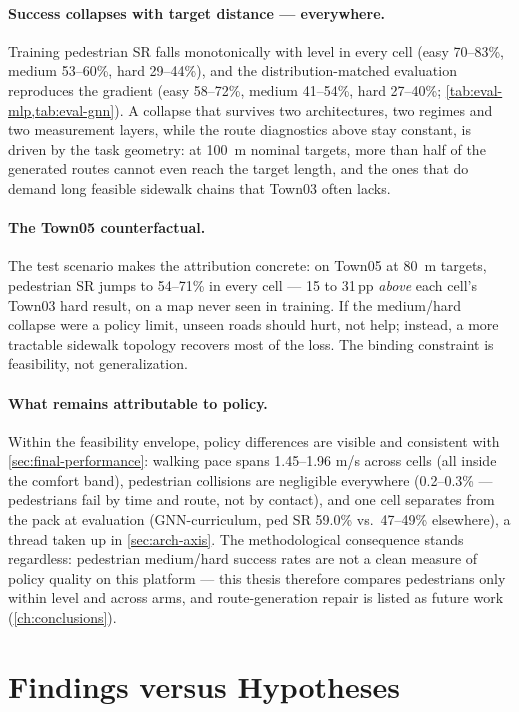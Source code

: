 \paragraph{Success collapses with target distance --- everywhere.}
Training pedestrian SR falls monotonically with level in every cell
(easy 70--83\%, medium 53--60\%, hard 29--44\%), and the
distribution-matched evaluation reproduces the gradient (easy 58--72\%,
medium 41--54\%, hard 27--40\%; \cref{tab:eval-mlp,tab:eval-gnn}). A
collapse that survives two architectures, two regimes and two
measurement layers, while the route diagnostics above stay constant, is
driven by the task geometry: at \SI{100}{m} nominal targets, more than
half of the generated routes cannot even reach the target length, and
the ones that do demand long feasible sidewalk chains that Town03 often
lacks.

\paragraph{The Town05 counterfactual.}
The test scenario makes the attribution concrete: on Town05 at
\SI{80}{m} targets, pedestrian SR jumps to 54--71\% in every cell ---
15 to 31\,pp \emph{above} each cell's Town03 hard result, on a map never
seen in training. If the medium/hard collapse were a policy limit,
unseen roads should hurt, not help; instead, a more tractable sidewalk
topology recovers most of the loss. The binding constraint is
feasibility, not generalization.

\paragraph{What remains attributable to policy.}
Within the feasibility envelope, policy differences are visible and
consistent with \cref{sec:final-performance}: walking pace spans
1.45--1.96 m/s across cells (all inside the comfort band), pedestrian
collisions are negligible everywhere (0.2--0.3\% --- pedestrians fail by
time and route, not by contact), and one cell separates from the pack at
evaluation (GNN-curriculum, ped SR 59.0\% vs.\ 47--49\% elsewhere),
a thread taken up in \cref{sec:arch-axis}. The methodological
consequence stands regardless: pedestrian medium/hard success rates are
not a clean measure of policy quality on this platform --- this thesis
therefore compares pedestrians only within level and across arms, and
route-generation repair is listed as future work
(\cref{ch:conclusions}).

\section{Findings versus Hypotheses}
\label{sec:findings}


